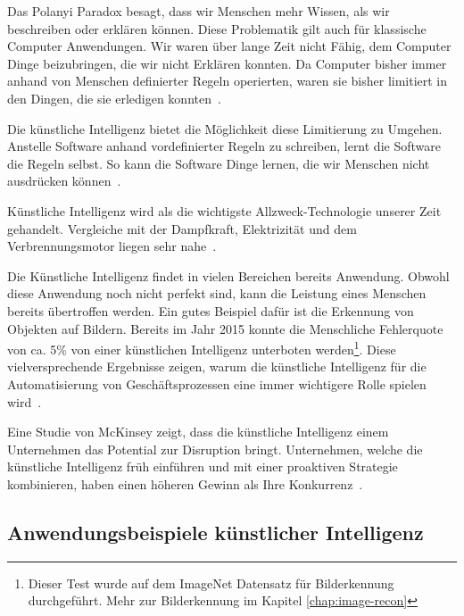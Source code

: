 Das Polanyi Paradox besagt, dass wir Menschen mehr Wissen, als wir beschreiben oder erklären können. Diese Problematik gilt auch für klassische Computer Anwendungen. Wir waren über lange Zeit nicht Fähig, dem Computer Dinge beizubringen, die wir nicht Erklären konnten. Da Computer bisher immer anhand von Menschen definierter Regeln operierten, waren sie bisher limitiert in den Dingen, die sie erledigen konnten~\autocite{McAfee}. 

Die künstliche Intelligenz bietet die Möglichkeit diese Limitierung zu Umgehen. Anstelle Software anhand vordefinierter Regeln zu schreiben, lernt die Software die Regeln selbst. So kann die Software Dinge lernen, die wir Menschen nicht ausdrücken können~\autocite{McAfee}.

Künstliche Intelligenz wird als die wichtigste Allzweck-Technologie unserer Zeit gehandelt. Vergleiche mit der Dampfkraft, Elektrizität und dem Verbrennungsmotor liegen sehr nahe~\autocite{McAfee}.

Die Künstliche Intelligenz findet in vielen Bereichen bereits Anwendung. Obwohl diese Anwendung noch nicht perfekt sind, kann die Leistung eines Menschen bereits übertroffen werden. Ein gutes Beispiel dafür ist die Erkennung von Objekten auf Bildern. Bereits im Jahr 2015 konnte die Menschliche Fehlerquote von ca. 5\% von einer künstlichen Intelligenz unterboten werden\footnote{Dieser Test wurde auf dem ImageNet Datensatz für Bilderkennung durchgeführt. Mehr zur Bilderkennung im Kapitel \ref{chap:image-recon}}. Diese vielversprechende Ergebnisse zeigen, warum die künstliche Intelligenz für die Automatisierung von Geschäftsprozessen eine immer wichtigere Rolle spielen wird~\autocite{McAfee}.

Eine Studie von McKinsey zeigt, dass die künstliche Intelligenz einem Unternehmen das Potential zur Disruption bringt. Unternehmen, welche die künstliche Intelligenz früh einführen und mit einer proaktiven Strategie kombinieren, haben einen höheren Gewinn als Ihre Konkurrenz~\autocite{Bughin}. 

\subsection{Anwendungsbeispiele künstlicher Intelligenz}


